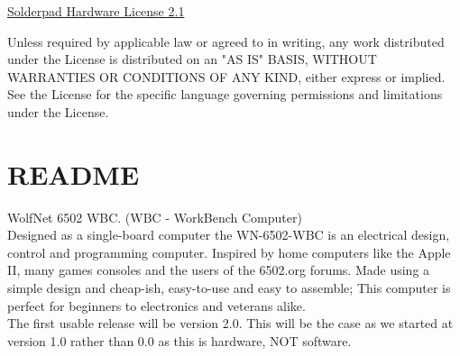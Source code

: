 \documentclass[11pt]{book} %
\begin{document}
\href{https://solderpad.org/licenses/SHL-2.1/}{Solderpad Hardware License 2.1}

Unless required by applicable law or agreed to in writing, any work distributed under the License is distributed on an "AS IS" BASIS, WITHOUT WARRANTIES OR CONDITIONS OF ANY KIND, either express or implied. See the License for the specific language governing permissions and limitations under the License.
\chapter{README}
WolfNet 6502 WBC. (WBC - WorkBench Computer)\\
Designed as a single-board computer the WN-6502-WBC is an electrical design, control and programming computer. Inspired by home computers like the Apple II, many games consoles and the users of the 6502.org forums. Made using a simple design and cheap-ish, easy-to-use and easy to assemble; This computer is perfect for beginners to electronics and veterans alike.\\
The first usable release will be version 2.0. This will be the case as we started at version 1.0 rather than 0.0 as this is hardware, NOT software.\\
\end{document}
